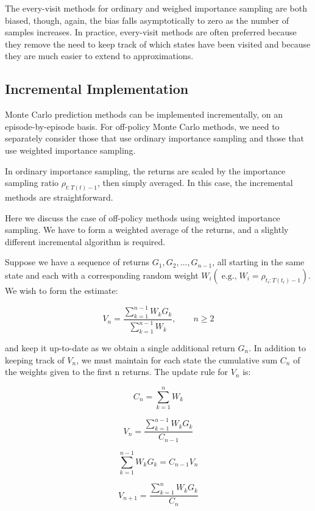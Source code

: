 \documentclass{article}
\begin{document}
The every-visit methods for ordinary and weighed importance sampling are both biased, though, again, the bias falls asymptotically to zero 
as the number of samples increases. In practice, every-visit methods are often preferred because they remove the need to keep track of which states have been visited 
and because they are much easier to extend to approximations.

\subsection{Incremental Implementation}

Monte Carlo prediction methods can be implemented incrementally, on an episode-by-episode basis. For off-policy Monte Carlo methods, 
we need to separately consider those that use ordinary importance sampling and those that use weighted importance sampling.

In ordinary importance sampling, the returns are scaled by the importance sampling ratio $\rho _ { t : T ( t ) - 1 }$, 
then simply averaged. In this case, the incremental methods are straightforward.

Here we discuss the case of off-policy methods using weighted importance sampling. We have to form a weighted average of the returns, 
and a slightly different incremental algorithm is required.

Suppose we have a sequence of returns $G _ { 1 } , G _ { 2 } , \ldots , G _ { n - 1 }$, all starting in the same state 
and each with a corresponding random weight $W _ { i } ( \operatorname { e . g . , } W _ { i } = \rho _ { t _ { i } : T ( t _ { i } ) - 1 } )$. 
We wish to form the estimate:

$$
V _ { n } = \frac { \sum _ { k = 1 } ^ { n - 1 } W _ { k } G _ { k } } { \sum _ { k = 1 } ^ { n - 1 } W _ { k } } , \qquad n \geq 2
$$

and keep it up-to-date as we obtain a single additional return $G _ { n }$. In addition to keeping track of $V _ { n }$, we must maintain for each state 
the cumulative sum $C _ { n }$ of the weights given to the first n returns. The update rule for $V _ { n }$ is:

$$
C _ { n } = \sum _ { k = 1 } ^ { n } W _ { k }
$$

$$
V_n = \frac{\sum_{k=1}^{n-1} W_k G_k}{C_{n-1}}
$$

$$
\sum_{k=1}^{n-1} W_k G_k = C_{n-1} V_n
$$

$$
V_{n+1} = \frac{\sum_{k=1}^{n} W_k G_k}{C_n}
$$
\end{document}
